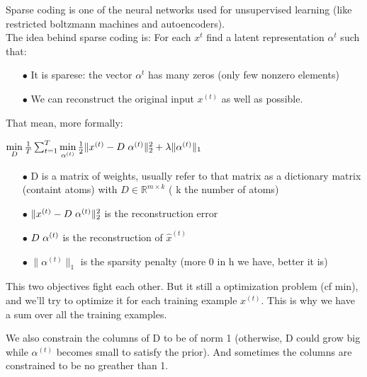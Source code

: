 \documentclass[a4paper,10pt]{article}
\newcommand{\R}{\mathbb{R}}
\begin{document}
Sparse coding is one of the neural networks used for unsupervised learning  (like restricted boltzmann machines and autoencoders).\\
The idea behind sparse coding is: For each $x^{t}$ find a latent representation $\alpha^{t}$ such that:
\begin{itemize}
 \item[$\bullet$] It is sparese: the vector $\alpha^{t}$ has many zeros (only few nonzero elements)
 \item[$\bullet$] We can reconstruct the original input $x^{(t)}$ as well as possible.
\end{itemize}
That mean, more formally:\\

\begin{center}
 $\min\limits_{D} \frac{1}{T} \sum_{t=1}^{T}  \min\limits_{\alpha^{(t)}} \frac{1}{2} \| x^{(t)} - D \hspace{3px} \alpha^{(t)} \|_2^2 + \lambda \|\alpha^{(t)} \|_1$\\
\end{center}

 \begin{itemize}
 \item[$\bullet$] D is a matrix of weights, usually refer to that matrix as a dictionary matrix (containt atoms) with $D \in  \R^{m \times k}$ ( k the number of atoms)
  \item[$\bullet$] $\| x^{(t)} - D \hspace{3px} \alpha^{(t)} \|_2^2 $ is the reconstruction error
  \item[$\bullet$]$ D \hspace{3px} \alpha^{(t)}$ is the reconstruction of $\hat{x}^{(t)}$
  \item[$\bullet$]$\|\alpha^{(t)} \|_1$ is the sparsity penalty (more 0 in h we have, better it is)
 \end{itemize}
This two objectives fight each other. But it still a optimization problem (cf min), and we'll try to optimize it for each training example $x^{(t)}$. This is why we have a sum over all the training examples.
\newline

\indent We also constrain the columns of D to be of norm 1 (otherwise, D could grow big while $\alpha^{(t)}$ becomes small to satisfy the prior). And sometimes the columns are constrained to be no greather than 1.\\
\end{document}
